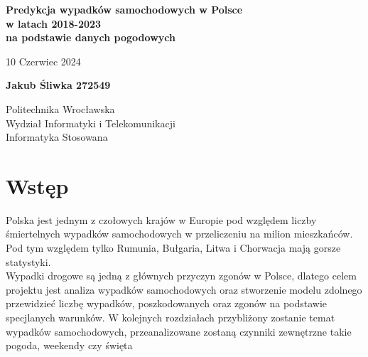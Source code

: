 \documentclass{article}
\begin{document}
\begin{titlepage}
    \begin{center}
        \vspace*{1cm}
            
        \Huge
        
        \textbf{Predykcja wypadków samochodowych w Polsce\\w latach 2018-2023\\na podstawie danych pogodowych}
            
        \vspace{0.5cm}
        \Large
        10 Czerwiec 2024
            
        \vspace{1.5cm}
            
        \textbf{Jakub Śliwka 272549}
        
        \vfill
            
        \vspace{0.8cm}
            
            
        \Large
        Politechnika Wrocławska\\
        Wydział Informatyki i Telekomunikacji\\
        Informatyka Stosowana
            
    \end{center}
\end{titlepage}

\tableofcontents

\section{Wstęp}

Polska jest jednym z czołowych krajów w Europie pod względem liczby śmiertelnych wypadków samochodowych w przeliczeniu na milion mieszkańców.
Pod tym względem tylko Rumunia, Bułgaria, Litwa i Chorwacja mają gorsze statystyki.\\

Wypadki drogowe są jedną z głównych przyczyn zgonów w Polsce, dlatego celem projektu jest analiza wypadków samochodowych oraz stworzenie modelu zdolnego przewidzieć liczbę wypadków, poszkodowanych oraz zgonów na podstawie specjlanych warunków. 
W kolejnych rozdziałach przybliżony zostanie temat wypadków samochodowych, przeanalizowane zostaną czynniki zewnętrzne takie pogoda, weekendy czy święta
\end{document}
